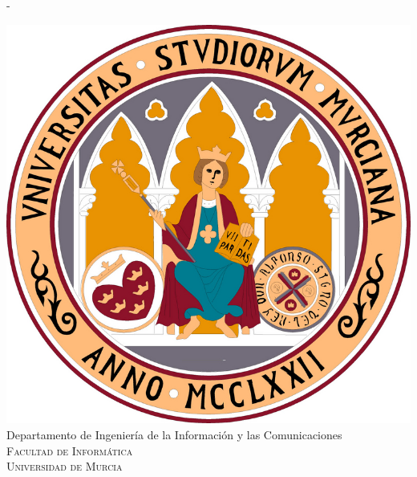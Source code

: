 %
%
% 
%
%
\begin{titlingpage}
\calccentering{\unitlength} 
\begin{adjustwidth*}{\unitlength}{-\unitlength}
\begin{center}
\vspace{-10mm}
\includegraphics[scale=0.8]{logos/UMU}\\
\vspace{6mm}
{\large Departamento de Ingeniería de la Información y las Comunicaciones\\
\vspace{1.5mm}
\textsc{Facultad de Informática}\\
\vspace{1.5mm}
\textsc{Universidad de Murcia}}\\
\vspace{11mm}


\end{center}
\end{adjustwidth*}
\end{titlingpage}
